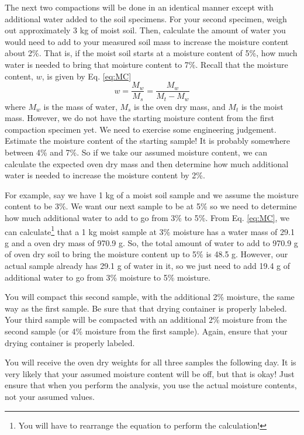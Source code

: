 \documentclass[12pt]{article}
\begin{document}
The next two compactions will be done in an identical manner except with additional water added to the soil specimens. For your second specimen, weigh out approximately 3 kg of moist soil. Then, calculate the amount of water you would need to add to your measured soil mass to increase the moisture content about 2\%. That is, if the moist soil starts at a moisture content of 5\%, how much water is needed to bring that moisture content to 7\%. Recall that the moisture content, $w$, is given by Eq. \ref{eq:MC}
\begin{equation}
    w=\dfrac{M_w}{M_s}=\dfrac{M_w}{M_t-M_w}
    \label{eq:MC}
\end{equation}
where $M_w$ is the mass of water, $M_s$ is the oven dry mass, and $M_t$ is the moist mass. However, we do not have the starting moisture content from the first compaction specimen yet. We need to exercise some engineering judgement. Estimate the moisture content of the starting sample! It is probably somewhere between 4\% and 7\%. So if we take our assumed moisture content, we can calculate the expected oven dry mass and then determine how much additional water is needed to increase the moisture content by 2\%.

For example, say we have 1 kg of a moist soil sample and we assume the moisture content to be 3\%. We want our next sample to be at 5\% so we need to determine how much additional water to add to go from 3\% to 5\%. From Eq. \ref{eq:MC}, we can calculate\footnote{You will have to rearrange the equation to perform the calculation!} that a 1 kg moist sample at 3\% moisture has a water mass of 29.1 g and a oven dry mass of 970.9 g. So, the total amount of water to add to 970.9 g of oven dry soil to bring the moisture content up to 5\% is 48.5 g. However, our actual sample already has 29.1 g of water in it, so we just need to add 19.4 g of additional water to go from 3\% moisture to 5\% moisture.

You will compact this second sample, with the additional 2\% moisture, the same way as the first sample. Be sure that that drying container is properly labeled. Your third sample will be compacted with an additional 2\% moisture from the second sample (or 4\% moisture from the first sample). Again, ensure that your drying container is properly labeled.

You will receive the oven dry weights for all three samples the following day. It is very likely that your assumed moisture content will be off, but that is okay! Just ensure that when you perform the analysis, you use the actual moisture contents, not your assumed values.
\end{document}
